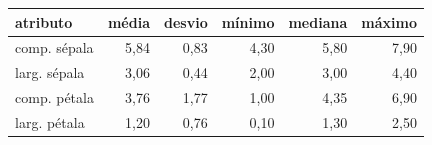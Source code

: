 
\begin{tabular}{lrrrrr}
\toprule
\textbf{atributo} & \textbf{média} & \textbf{desvio} & \textbf{mínimo} & \textbf{mediana} & \textbf{máximo} \\
\midrule
comp. sépala & 5{,}84 & 0{,}83 & 4{,}30 & 5{,}80 & 7{,}90 \\
larg. sépala & 3{,}06 & 0{,}44 & 2{,}00 & 3{,}00 & 4{,}40 \\
comp. pétala & 3{,}76 & 1{,}77 & 1{,}00 & 4{,}35 & 6{,}90 \\
larg. pétala & 1{,}20 & 0{,}76 & 0{,}10 & 1{,}30 & 2{,}50 \\
\bottomrule
\end{tabular}

